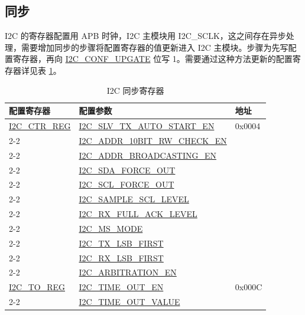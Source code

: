 \documentclass[main\_\_CN.tex]{subfiles}
\begin{document}
\subsection{同步}
I2C 的寄存器配置用 APB 时钟，I2C 主模块用 I2C\_SCLK，这之间存在异步处理，需要增加同步的步骤将配置寄存器的值更新进入 I2C 主模块。步骤为先写配置寄存器，再向 \hyperref[fielddesc:I2CCONFUPGATE]{I2C\_CONF\_UPGATE} 位写 1。需要通过这种方法更新的配置寄存器详见表 \ref{tab:i2c-sync-reg}。

\begin{longtable}{ | p{6cm} | p{7cm} | p{2cm} | }
\caption{I2C 同步寄存器}
\label{tab:i2c-sync-reg}
\\\hline
\rowcolor{lightgray}
配置寄存器& 配置参数 & 地址  \\ \hline


\hyperref[regdesc:I2CCTRREG]{I2C\_CTR\_REG} & {\hyperref[fielddesc:I2CSLVTXAUTOSTARTEN]{I2C\_SLV\_TX\_AUTO\_START\_EN}} & 0x0004  \\\cline{2-2}

& {\hyperref[fielddesc:I2CADDR10BITRWCHECKEN]{I2C\_ADDR\_10BIT\_RW\_CHECK\_EN}}& \\\cline{2-2}
& {\hyperref[fielddesc:I2CADDRBROADCASTINGEN]{I2C\_ADDR\_BROADCASTING\_EN}}& \\\cline{2-2}
& {\hyperref[fielddesc:I2CSDAFORCEOUT]{I2C\_SDA\_FORCE\_OUT}}& \\\cline{2-2}
& {\hyperref[fielddesc:I2CSCLFORCEOUT]{I2C\_SCL\_FORCE\_OUT}}& \\\cline{2-2}
& {\hyperref[fielddesc:I2CSAMPLESCLLEVEL]{I2C\_SAMPLE\_SCL\_LEVEL}}& \\\cline{2-2}
& {\hyperref[fielddesc:I2CRXFULLACKLEVEL]{I2C\_RX\_FULL\_ACK\_LEVEL}}& \\\cline{2-2}
& {\hyperref[fielddesc:I2CMSMODE]{I2C\_MS\_MODE}}& \\\cline{2-2}
& {\hyperref[fielddesc:I2CTXLSBFIRST]{I2C\_TX\_LSB\_FIRST}}& \\\cline{2-2}
& {\hyperref[fielddesc:I2CRXLSBFIRST]{I2C\_RX\_LSB\_FIRST}}& \\\cline{2-2}
& {\hyperref[fielddesc:I2CARBITRATIONEN]{I2C\_ARBITRATION\_EN}}& \\ \hline

\hyperref[regdesc:I2CTOREG]{I2C\_TO\_REG} & {\hyperref[fielddesc:I2CTIMEOUTEN]{I2C\_TIME\_OUT\_EN}} & 0x000C  \\\cline{2-2}
& {\hyperref[fielddesc:I2CTIMEOUTVALUE]{I2C\_TIME\_OUT\_VALUE}}& \\ \hline


\end{longtable}
\end{document}
